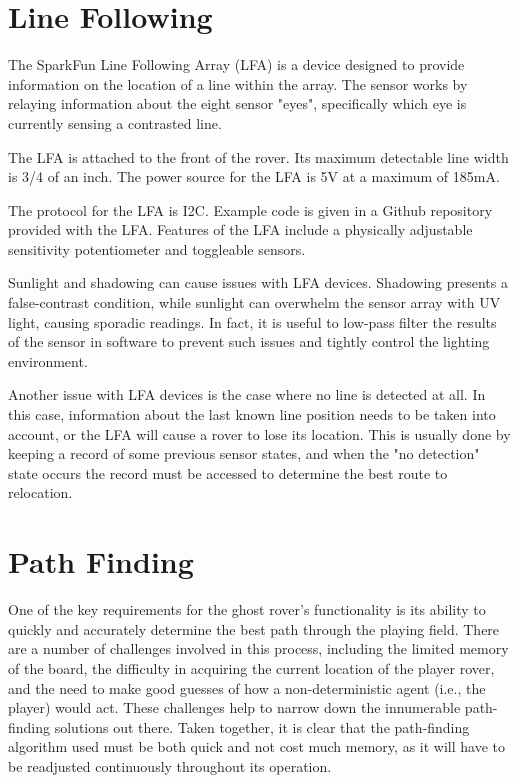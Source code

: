 \documentclass[12pt,letterpaper]{article}
\begin{document}
\section{Line Following}
The SparkFun Line Following Array (LFA) is a device designed to provide information on the location of a line within the array. The sensor works by relaying information about the eight sensor "eyes", specifically which eye is currently sensing a contrasted line. 

The LFA is attached to the front of the rover. Its maximum detectable line width is 3/4 of an inch. The power source for the LFA is 5V at a maximum of 185mA. 

The protocol for the LFA is I2C. Example code is given in a Github repository provided with the LFA. Features of the LFA include a physically adjustable sensitivity potentiometer and toggleable sensors. 

Sunlight and shadowing can cause issues with LFA devices. Shadowing presents a false-contrast condition, while sunlight can overwhelm the sensor array with UV light, causing sporadic readings. In fact, it is useful to low-pass filter the results of the sensor in software to prevent such issues and tightly control the lighting environment.

Another issue with LFA devices is the case where no line is detected at all. In this case, information about the last known line position needs to be taken into account, or the LFA will cause a rover to lose its location. This is usually done by keeping a record of some previous sensor states, and when the "no detection" state occurs the record must be accessed to determine the best route to relocation.

\section{Path Finding}
One of the key requirements for the ghost rover's functionality is its ability to quickly and accurately determine the best path through the playing field. There are a number of challenges involved in this process, including the limited memory of the board, the difficulty in acquiring the current location of the player rover, and the need to make good guesses of how a non-deterministic agent (i.e., the player) would act. These challenges help to narrow down the innumerable path-finding solutions out there. Taken together, it is clear that the path-finding algorithm used must be both quick and not cost much memory, as it will have to be readjusted continuously throughout its operation.
	
\end{document}
